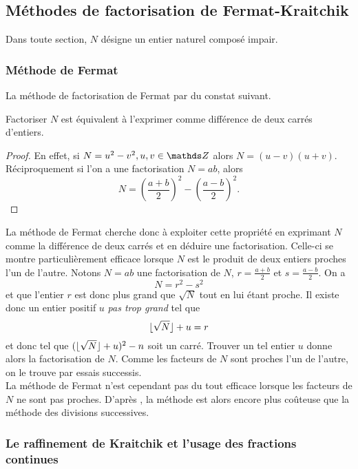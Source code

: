 \subsection{Méthodes de factorisation de Fermat-Kraitchik}

Dans toute section, $N$ désigne un entier naturel composé impair.

\subsubsection{Méthode de Fermat}

La méthode de factorisation de Fermat par du constat suivant.

\begin{lemme}
	Factoriser $N$ est équivalent à l'exprimer comme différence de deux carrés
	d'entiers.
\end{lemme}

\begin{proof}
	En effet, si $N = u^2 - v^2, u, v\in \Z$ alors $N = (u-v)(u + v)$.
	Réciproquement si l'on a une factorisation $N = ab$, alors \[N =
	\left(\frac{a+b}{2}\right)^2 - \left(\frac{a-b}{2}\right)^2.\]
\end{proof}

La méthode de Fermat cherche donc à exploiter cette propriété en exprimant $N$
comme la différence de deux carrés et en déduire une factorisation. Celle-ci se
montre particulièrement efficace lorsque $N$ est le produit de deux entiers
proches l'un de l'autre. Notons $N=ab$ une factorisation de $N$,
$r=\frac{a+b}{2}$ et $s=\frac{a-b}{2}$. On a \[N = r^2 - s^2\] et que l'entier
$r$ est donc plus grand que $\sqrt{N}$ tout en lui étant proche. Il existe donc
un entier positif $u$ \emph{pas trop grand} tel que \[\lfloor\sqrt{N}\rfloor + u = r\]
et donc tel que $(\lfloor\sqrt{N}\rfloor + u)^2 - n$ soit un carré. Trouver un tel
entier $u$ donne alors la factorisation de $N$. Comme les facteurs de $N$ sont
proches l'un de l'autre, on le trouve par essais successis. \\

La méthode de Fermat n'est cependant pas du tout efficace lorsque les facteurs
de $N$ ne sont pas proches. D'après , la méthode est alors encore plus
coûteuse que la méthode des divisions successives.

\subsubsection{Le raffinement de Kraitchik et l'usage des fractions continues}

